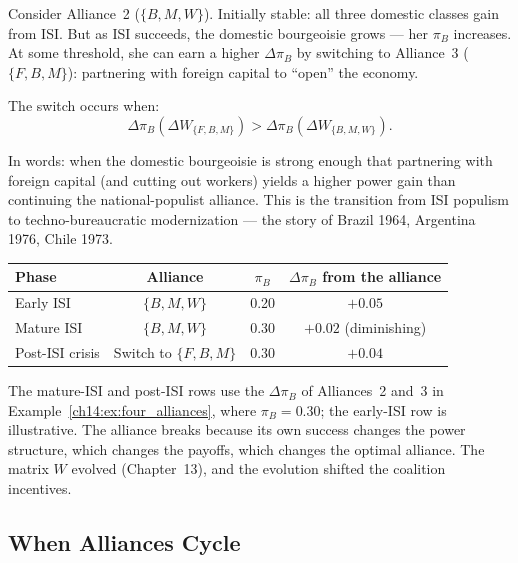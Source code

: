 \documentclass[../structural_economics_book.tex]{subfiles}
\begin{document}
\begin{example}\label{ch14:ex:breaks}
Consider Alliance~2 ($\{B, M, W\}$). Initially stable: all three domestic classes gain from ISI. But as ISI succeeds, the domestic bourgeoisie grows --- her $\pi_B$ increases. At some threshold, she can earn a higher $\Delta\pi_B$ by switching to Alliance~3 ($\{F, B, M\}$): partnering with foreign capital to ``open'' the economy.

The switch occurs when:
\begin{equation}\label{ch14:eq:switch}
\Delta\pi_B(\Delta W_{\{F,B,M\}}) > \Delta\pi_B(\Delta W_{\{B,M,W\}}).
\end{equation}

In words: when the domestic bourgeoisie is strong enough that partnering with foreign capital (and cutting out workers) yields a higher power gain than continuing the national-populist alliance. This is the transition from ISI populism to techno-bureaucratic modernization --- the story of Brazil 1964, Argentina 1976, Chile 1973.

\begin{center}
\begin{tabular}{lccc}
\toprule
Phase & Alliance & $\pi_B$ & $\Delta\pi_B$ from the alliance \\
\midrule
Early ISI & $\{B, M, W\}$ & 0.20 & $+0.05$ \\
Mature ISI & $\{B, M, W\}$ & 0.30 & $+0.02$ (diminishing) \\
Post-ISI crisis & Switch to $\{F, B, M\}$ & 0.30 & $+0.04$ \\
\bottomrule
\end{tabular}
\end{center}

The mature-ISI and post-ISI rows use the $\Delta\pi_B$ of Alliances~2 and~3 in Example~\ref{ch14:ex:four_alliances}, where $\pi_B = 0.30$; the early-ISI row is illustrative. The alliance breaks because its own success changes the power structure, which changes the payoffs, which changes the optimal alliance. The matrix $W$ evolved (Chapter~13), and the evolution shifted the coalition incentives.
\end{example}


\subsection{When Alliances Cycle}
\end{document}
